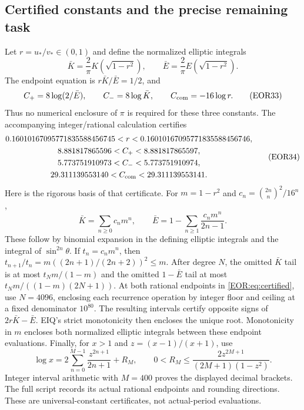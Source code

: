 \documentclass[11pt,a4paper]{article}
\begin{document}
\subsection{Certified constants and the precise remaining task}
Let $r=u_*/v_*\in(0,1)$ and define the normalized elliptic integrals
\[
 \bar K=\frac{2}{\pi}K(\sqrt{1-r^2}),\qquad
 \bar E=\frac{2}{\pi}E(\sqrt{1-r^2}).
\]
The endpoint equation is $r\bar K/\bar E=1/2$, and
\begin{equation}
 C_+=8\log(2/\bar E),\qquad C_-=8\log\bar K,
 \qquad C_{\rm com}=-16\log r.
 \label{EOR:eq:ellipticconstants}
\tag{EOR33}
\end{equation}
Thus no numerical enclosure of $\pi$ is required for these three constants.
The accompanying integer/rational calculation certifies
\begin{equation}
\begin{gathered}
 0.16010167095771835588456745<r<
 0.16010167095771835588456746,\\
 8.881817865596<C_+<8.881817865597,\\
 5.773751910973<C_-<5.773751910974,\\
 29.311139553140<C_{\rm com}<29.311139553141.
\end{gathered}\label{EOR:eq:certified}
\tag{EOR34}
\end{equation}
Here is the rigorous basis of that certificate. For $m=1-r^2$ and
$c_n=\binom{2n}{n}^2/16^n$,
\[
 \bar K=\sum_{n\ge0}c_nm^n,\qquad
 \bar E=1-\sum_{n\ge1}\frac{c_nm^n}{2n-1}.
\]
These follow by binomial expansion in the defining elliptic integrals and the
integral of $\sin^{2n}\theta$. If $t_n=c_nm^n$, then
$t_{n+1}/t_n=m((2n+1)/(2n+2))^2\le m$.
After degree $N$, the omitted $\bar K$ tail is at most $t_Nm/(1-m)$ and the
omitted $1-\bar E$ tail at most $t_Nm/((1-m)(2N+1))$.
At both rational endpoints in \eqref{EOR:eq:certified}, use $N=4096$, enclosing each
recurrence operation by integer floor and ceiling at a fixed denominator
$10^{80}$. The resulting intervals certify opposite signs of
$2r\bar K-\bar E$. EIQ's strict monotonicity then encloses the unique root.
Monotonicity in $m$ encloses both normalized elliptic integrals between these
endpoint evaluations. Finally, for $x>1$ and $z=(x-1)/(x+1)$, use
\[
 \log x=2\sum_{n=0}^{M-1}\frac{z^{2n+1}}{2n+1}+R_M,
 \qquad0<R_M\le\frac{2z^{2M+1}}{(2M+1)(1-z^2)}.
\]
Integer interval arithmetic with $M=400$ proves the displayed decimal brackets.
The full script records its actual rational endpoints and rounding directions.
These are universal-constant certificates, not actual-period evaluations.
\end{document}
